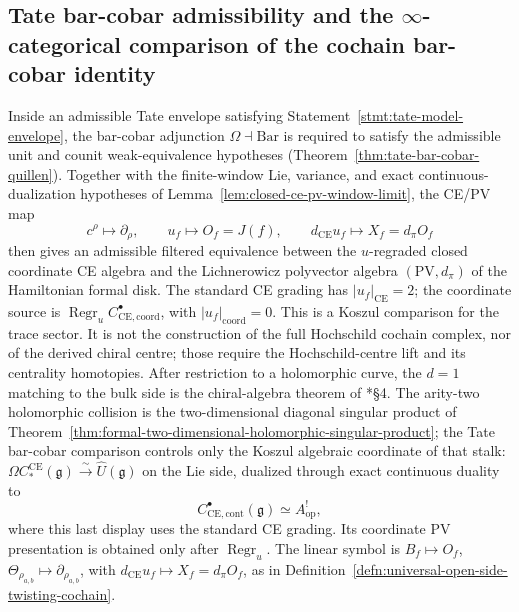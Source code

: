 \subsection[Tate bar-cobar admissibility and the infinity-categorical comparison]{Tate bar-cobar admissibility and the $\infty$-categorical
comparison of the cochain bar-cobar identity}\label{sec:tate-quillen}

Inside an admissible Tate envelope satisfying
Statement~\ref{stmt:tate-model-envelope}, the bar-cobar adjunction
\(\Omega\dashv\mathrm{Bar}\) is required to satisfy the admissible
unit and counit weak-equivalence hypotheses
(Theorem~\ref{thm:tate-bar-cobar-quillen}).  Together with the
finite-window Lie, variance, and exact continuous-dualization hypotheses
of Lemma~\ref{lem:closed-ce-pv-window-limit}, the CE/PV map
\[
  c^\rho\longmapsto\partial_\rho,
  \qquad
  u_f\longmapsto O_f=J(f),
  \qquad
  d_{\mathrm{CE}}u_f\longmapsto X_f=d_\pi O_f
\]
then gives an admissible filtered equivalence between the
\(u\)-regraded closed coordinate CE algebra and the Lichnerowicz
polyvector algebra \((\mathrm{PV},d_\pi)\) of the Hamiltonian formal
disk.  The standard CE grading has \(|u_f|_{\mathrm{CE}}=2\); the
coordinate source is
\(\operatorname{Regr}_uC^\bullet_{\mathrm{CE},\mathrm{coord}}\), with
\(|u_f|_{\mathrm{coord}}=0\).  This is a
Koszul comparison for the trace sector.  It is not the construction of
the full Hochschild cochain complex, nor of the derived chiral centre;
those require the Hochschild-centre lift and its centrality homotopies.
After restriction to a holomorphic curve, the \(d=1\) matching to the
bulk side is the chiral-algebra theorem of
\cite{beilinson-drinfeld-chiral}*{\S 4}.  The arity-two holomorphic collision
is the two-dimensional diagonal singular product of
Theorem~\ref{thm:formal-two-dimensional-holomorphic-singular-product}; the Tate
bar-cobar comparison controls only the Koszul algebraic coordinate of
that stalk:
\(\Omega C_*^{\mathrm{CE}}(\mathfrak g)\xrightarrow{\sim}\widehat
U(\mathfrak g)\) on the Lie side, dualized through exact continuous
duality to
\[
  C^\bullet_{\mathrm{CE},\mathrm{cont}}(\mathfrak g)
    \simeq A_{\mathrm{op}}^!,
\]
where this last display uses the standard CE grading.  Its coordinate
PV presentation is obtained only after \(\operatorname{Regr}_u\).  The
linear symbol is \(B_f\mapsto O_f\),
\(\Theta_{\rho_{a,b}}\mapsto\partial_{\rho_{a,b}}\), with
\(d_{\mathrm{CE}}u_f\mapsto X_f=d_\pi O_f\), as in
Definition~\ref{defn:universal-open-side-twisting-cochain}.


